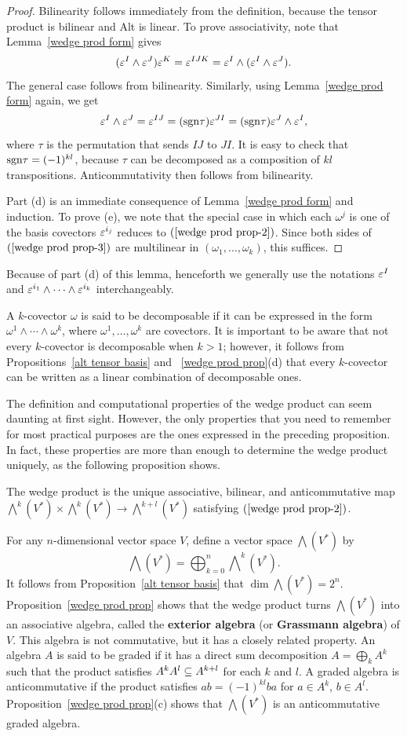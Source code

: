 \begin{proof}
Bilinearity follows immediately from the definition, because the tensor product is bilinear and Alt is linear. To prove associativity, note that Lemma~\ref{wedge prod form} gives
\[(\varepsilon^I\wedge\varepsilon^J)\varepsilon^K=\varepsilon^{IJK}=\varepsilon^I\wedge(\varepsilon^I\wedge\varepsilon^J).\]
The general case follows from bilinearity. Similarly, using Lemma~\ref{wedge prod form} again, we get
\[\varepsilon^I\wedge\varepsilon^J=\varepsilon^{IJ}=(\mathrm{sgn}\tau)\varepsilon^{JI}=(\mathrm{sgn}\tau)\varepsilon^{J}\wedge\varepsilon^{I},\]
where $\tau$ is the permutation that sends $IJ$ to $JI$. It is easy to check that $\mathrm{sgn}\tau=(-1)^{kl}$, because $\tau$ can be decomposed as a composition of $kl$ transpositions. Anticommutativity then follows from bilinearity.\par
Part (d) is an immediate consequence of Lemma~\ref{wedge prod form} and induction. To prove (e), we note that the special case in which each $\omega^j$ is one of the basis covectors $\varepsilon^{i_j}$ reduces to $(\ref{wedge prod prop-2})$. Since both sides of $(\ref{wedge prod prop-3})$ are multilinear in $(\omega_1,\dots,\omega_k)$, this suffices.
\end{proof}
Because of part (d) of this lemma, henceforth we generally use the notations $\varepsilon^I$ and $\varepsilon^{i_1}\wedge\cdots\wedge\varepsilon^{i_k}$ interchangeably.\par
A $k$-covector $\omega$ is said to be decomposable if it can be expressed in the form $\omega^{1}\wedge\cdots\wedge\omega^k$, where $\omega^1,\dots,\omega^k$ are covectors. It is important to be aware that not every $k$-covector is decomposable when $k>1$; however, it follows from Propositions~\ref{alt tensor basis} and ~\ref{wedge prod prop}(d) that every $k$-covector can be written as a linear combination of decomposable ones.\par
The definition and computational properties of the wedge product can seem daunting at first sight. However, the only properties that you need to remember for most practical purposes are the ones expressed in the preceding proposition. In fact,
these properties are more than enough to determine the wedge product uniquely, as
the following proposition shows.
\begin{proposition}
The wedge product is the unique associative, bilinear, and anticommutative map $\bigwedge^k(V^*)\times\bigwedge^k(V^*)\to\bigwedge^{k+l}(V^*)$ satisfying $(\ref{wedge prod prop-2})$.
\end{proposition}
For any $n$-dimensional vector space $V$, define a vector space $\bigwedge(V^*)$ by
\[\bigwedge(V^*)=\bigoplus_{k=0}^{n}\bigwedge\nolimits^k(V^*).\]
It follows from Proposition~\ref{alt tensor basis} that $\dim\bigwedge(V^*)=2^n$. Proposition~\ref{wedge prod prop} shows that the wedge product turns $\bigwedge(V^*)$ into an associative algebra, called the \textbf{exterior algebra} (or \textbf{Grassmann algebra}) of $V$. This algebra is not commutative, but it has
a closely related property. An algebra $A$ is said to be graded if it has a direct sum decomposition $A=\bigoplus_kA^k$ such that the product satisfies $A^kA^l\subseteq A^{k+l}$ for each $k$ and $l$. A graded algebra is anticommutative if the product satisfies $ab=(-1)^{kl}ba$ for $a\in A^k$, $b\in A^l$. Proposition~\ref{wedge prod prop}(c) shows that $\bigwedge(V^*)$ is an anticommutative graded algebra.
